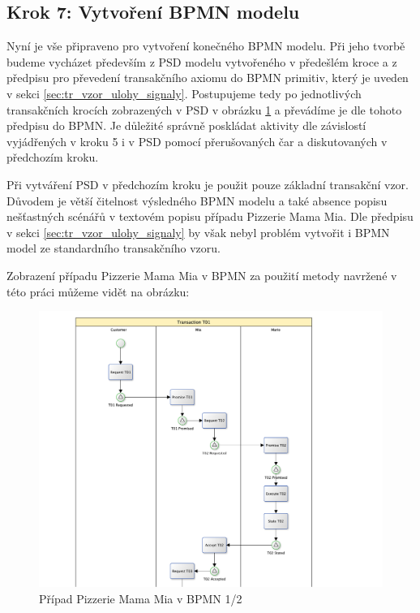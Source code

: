\documentclass[]{article}
\begin{document}
\subsection{Krok 7: Vytvoření BPMN modelu}
Nyní je vše připraveno pro vytvoření konečného BPMN modelu. Při jeho tvorbě budeme vycházet především z PSD modelu vytvořeného v předešlém kroce a z předpisu pro převedení transakčního axiomu do BPMN primitiv, který je uveden v sekci \ref{sec:tr_vzor_ulohy_signaly}. Postupujeme tedy po jednotlivých transakčních krocích zobrazených v PSD v obrázku \ref{fig:psd_pizzeria} a převádíme je dle tohoto předpisu do BPMN. Je důležité správně poskládat aktivity dle závislostí vyjádřených v kroku 5 i v PSD pomocí přerušovaných čar a diskutovaných v předchozím kroku.

Při vytváření PSD v předchozím kroku je použit pouze základní transakční vzor. Důvodem je větší čitelnost výsledného BPMN modelu a také absence popisu nešťastných scénářů v textovém popisu případu Pizzerie Mama Mia. Dle předpisu v sekci \ref{sec:tr_vzor_ulohy_signaly} by však nebyl problém vytvořit i BPMN model ze standardního transakčního vzoru.

Zobrazení případu Pizzerie Mama Mia v BPMN za použití metody navržené v této práci můžeme vidět na obrázku:

\begin{center}
\begin{figure}[H]
\centerline{\includegraphics[width=1.28\textwidth,height=\textheight,keepaspectratio]{obrazky/pizzeria-bpmn-1}}
\caption{Případ Pizzerie Mama Mia v BPMN 1/2}
\label{fig:psd_pizzeria}
\end{figure}
\end{center}
\end{document}
